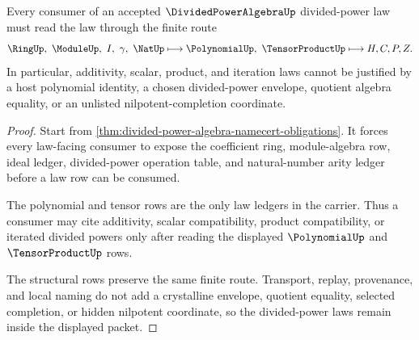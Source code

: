 \begin{theorem}
\label{thm:divided-power-law-nonescape}
Every consumer of an accepted $\DividedPowerAlgebraUp$ divided-power law must read the law through the finite route
$$
\RingUp,\ \ModuleUp,\ I,\ \gamma,\ \NatUp
\longmapsto \PolynomialUp,\ \TensorProductUp
\longmapsto H,C,P,Z .
$$
In particular, additivity, scalar, product, and iteration laws cannot be justified by a host polynomial identity, a chosen divided-power envelope, quotient algebra equality, or an unlisted nilpotent-completion coordinate.
\end{theorem}
\begin{proof}
Start from \autoref{thm:divided-power-algebra-namecert-obligations}. It forces every law-facing consumer to expose the coefficient ring, module-algebra row, ideal ledger, divided-power operation table, and natural-number arity ledger before a law row can be consumed.

The polynomial and tensor rows are the only law ledgers in the carrier. Thus a consumer may cite additivity, scalar compatibility, product compatibility, or iterated divided powers only after reading the displayed $\PolynomialUp$ and $\TensorProductUp$ rows.

The structural rows preserve the same finite route. Transport, replay, provenance, and local naming do not add a crystalline envelope, quotient equality, selected completion, or hidden nilpotent coordinate, so the divided-power laws remain inside the displayed packet.
\end{proof}




